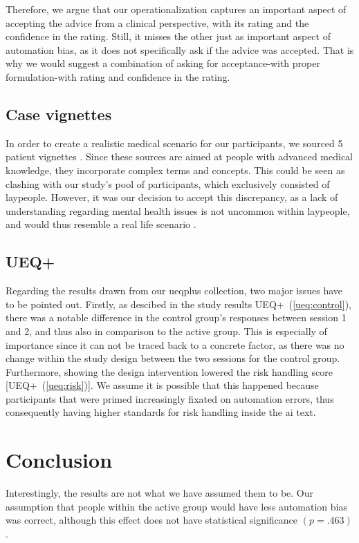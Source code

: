 \documentclass[sigconf,natbib=false]{acmart}
\begin{document}
Therefore, we argue that our operationalization captures an important aspect of accepting the advice from a clinical perspective, with its rating and the confidence in the rating.
Still, it misses the other just as important aspect of automation bias, as it does not specifically ask if the advice was accepted.
That is why we would suggest a combination of asking for acceptance-with proper formulation-with rating and confidence in the rating.


\subsection{Case vignettes}

In order to create a realistic medical scenario for our participants, we sourced 5 patient vignettes \autocite[]{ bar_fallbeispiel_psyche_psychosomatik, theraphysia_mentale_gesundheit, dbjr_stoerungsbilder}.
Since these sources are aimed at people with advanced medical knowledge, they incorporate complex terms and concepts.
This could be seen as clashing with our study's pool of participants, which exclusively consisted of laypeople.
However, it was our decision to accept this discrepancy, as a lack of understanding regarding mental health issues is not uncommon within laypeople, and would thus resemble a real life scenario \autocite[]{lacketal_misunderstanding}.


\subsection{UEQ+}

Regarding the results drawn from our \gls{ueqplus} collection, two major issues have to be pointed out.
Firstly, as descibed in the study results UEQ+~(\ref{ueq:control}), there was a notable difference in the control group's responses between session 1 and 2, and thus also in comparison to the active group.
This is especially of importance since it can not be traced back to a concrete factor, as there was no change within the study design between the two sessions for the control group.
Furthermore, showing the design intervention lowered the risk handling score [UEQ+~(\ref{ueq:risk})].
We assume it is possible that this happened because participants that were primed increasingly fixated on automation errors, thus consequently having higher standards for risk handling inside the \gls{ai} text.

\section{Conclusion}
Interestingly, the results are not what we have assumed them to be.
Our assumption that people within the active group would have less automation bias was correct, although this effect does not have statistical significance \((p = .463)\).
\end{document}
